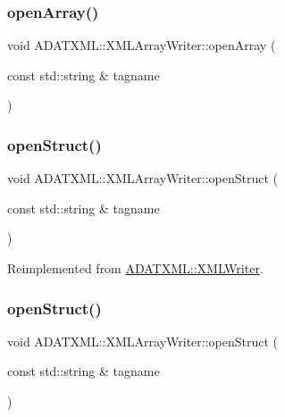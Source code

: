 \subsubsection{\texorpdfstring{openArray()}{openArray()}\hspace{0.1cm}{\footnotesize\ttfamily [2/2]}}
{\footnotesize\ttfamily void A\+D\+A\+T\+X\+M\+L\+::\+X\+M\+L\+Array\+Writer\+::open\+Array (\begin{DoxyParamCaption}\item[{const std\+::string \&}]{tagname }\end{DoxyParamCaption})}

\mbox{\label{classADATXML_1_1XMLArrayWriter_af1602cb14d54aa8e42442f2784c00e22}} 
\subsubsection{\texorpdfstring{openStruct()}{openStruct()}\hspace{0.1cm}{\footnotesize\ttfamily [1/2]}}
{\footnotesize\ttfamily void A\+D\+A\+T\+X\+M\+L\+::\+X\+M\+L\+Array\+Writer\+::open\+Struct (\begin{DoxyParamCaption}\item[{const std\+::string \&}]{tagname }\end{DoxyParamCaption})\hspace{0.3cm}{\ttfamily [virtual]}}



Reimplemented from \mbox{\hyperlink{classADATXML_1_1XMLWriter_a8f9728743acfd9c15ab5d69bf8800a5e}{A\+D\+A\+T\+X\+M\+L\+::\+X\+M\+L\+Writer}}.

\mbox{\label{classADATXML_1_1XMLArrayWriter_af1602cb14d54aa8e42442f2784c00e22}} 
\subsubsection{\texorpdfstring{openStruct()}{openStruct()}\hspace{0.1cm}{\footnotesize\ttfamily [2/2]}}
{\footnotesize\ttfamily void A\+D\+A\+T\+X\+M\+L\+::\+X\+M\+L\+Array\+Writer\+::open\+Struct (\begin{DoxyParamCaption}\item[{const std\+::string \&}]{tagname }\end{DoxyParamCaption})\hspace{0.3cm}{\ttfamily [virtual]}}



